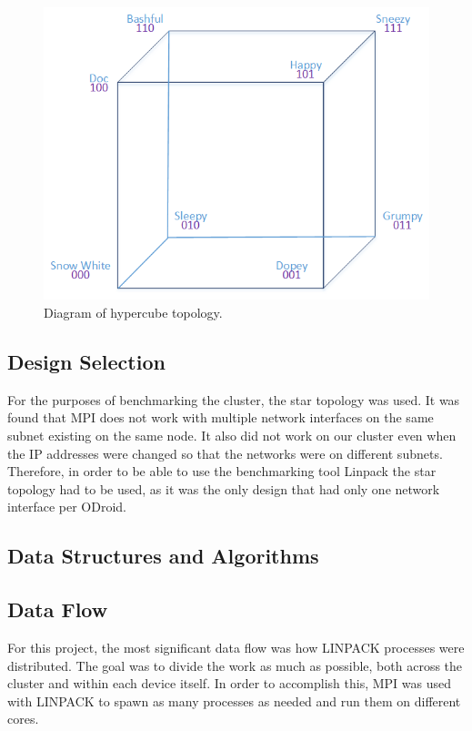 \begin{figure}[h]
	\caption{Diagram of hypercube topology.}
	\centering
		\includegraphics[scale=0.5]{HyperCube2.png}
\end{figure}


 \subsection{Design Selection}
	For the purposes of benchmarking the cluster, the star topology was used. It was found that MPI does not work with multiple network interfaces on the same subnet existing on the same node. It also did not work on our cluster even when the IP addresses were changed so that the networks were on different subnets. Therefore, in order to be able to use the benchmarking tool Linpack the star topology had to be used, as it was the only design that had only one network interface per ODroid.
 
 \subsection{Data Structures and Algorithms}
	

 \subsection{Data Flow}
	For this project, the most significant data flow was how LINPACK processes were distributed. The goal was to divide the work as much as possible, both across the cluster and within each device itself. In order to accomplish this, MPI was used with LINPACK to spawn as many processes as needed and run them on different cores. 
 
